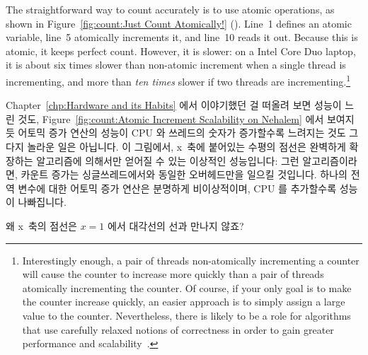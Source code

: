 The straightforward way to count accurately is to use atomic operations,
as shown in
Figure~\ref{fig:count:Just Count Atomically!} ().
Line~1 defines an atomic variable, line~5 atomically increments it, and
line~10 reads it out.
Because this is atomic, it keeps perfect count.
However, it is slower: on a Intel Core Duo laptop, it is about
six times slower than non-atomic increment
when a single thread is incrementing, and more than \emph{ten times}
slower if two threads are incrementing.\footnote{
	Interestingly enough, a pair of threads non-atomically incrementing
	a counter will cause the counter to increase more quickly than
	a pair of threads atomically incrementing the counter.
	Of course, if your only goal is to make the counter increase
	quickly, an easier approach is to simply assign a large value
	to the counter.
	Nevertheless, there is likely to be a role for algorithms that
	use carefully relaxed notions of correctness in order to gain
	greater performance and
	scalability~\cite{Andrews91textbook,Arcangeli03,DavidUngar2011unsync}.}
\fi

Chapter~\ref{chp:Hardware and its Habits} 에서 이야기했던 걸 떠올려 보면
성능이 느린 것도,
Figure~\ref{fig:count:Atomic Increment Scalability on Nehalem} 에서 보여지듯
어토믹 증가 연산의 성능이 CPU 와 쓰레드의 숫자가 증가할수록 느려지는 것도
그다지 놀라운 일은 아닙니다.
이 그림에서, x~축에 붙어있는 수평의 점선은 완벽하게 확장하는 알고리즘에
의해서만 얻어질 수 있는 이상적인 성능입니다: 그런 알고리즘이라면, 카운트 증가는
싱글쓰레드에서와 동일한 오버헤드만을 일으킬 것입니다.
하나의 전역 변수에 대한 어토믹 증가 연산은 분명하게 비이상적이며, CPU 를
추가할수록 성능이 나빠집니다.

\QuickQuiz{}
	왜 x~축의 점선은 $x=1$ 에서 대각선의 선과 만나지 않죠?
	\iffalse

